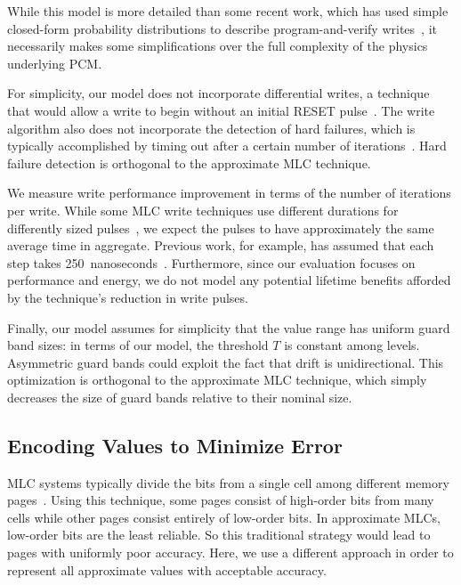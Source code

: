 \documentclass[prodmode,acmtocs]{acmsmall}
\begin{document}
While this model is more detailed than some recent work, which has used simple
closed-form probability distributions to describe program-and-verify
writes~\cite{improvingwrites,writecancel}, it necessarily makes some
simplifications over the full complexity of the physics underlying PCM.

For simplicity, our model does not incorporate differential writes, a
technique that would allow a write to begin without an initial
RESET pulse~\cite{improvingwrites}. The write algorithm also does not
incorporate the detection of hard failures, which is typically
accomplished by timing out after a certain number of
iterations~\cite{mlcflash}. Hard failure detection is orthogonal to
the approximate MLC technique.

We measure write performance improvement in terms of the number of
iterations per write. While some MLC write techniques use different
durations for differently sized pulses~\cite{mlcmodelchar,partialreset,mlcwritestrategies}, we expect the
pulses to have approximately the same average time in aggregate.
Previous work, for example, has assumed that each step takes
250~nanoseconds~\cite{writecancel,improvingwrites}.
Furthermore, since our evaluation focuses on performance and energy, we do not
model any potential lifetime benefits afforded by the technique's reduction in
write pulses.

Finally, our model assumes for simplicity that the value range has
uniform guard band sizes: in terms of our model, the threshold $T$ is
constant among levels.
Asymmetric
guard bands could exploit the fact that drift is unidirectional.
This optimization is orthogonal to the approximate MLC technique,
which simply decreases the size of guard bands relative to their
nominal size.

\subsection{Encoding Values to Minimize Error}
\label{sec:coding}

MLC systems typically divide the bits from a single cell among different
memory pages~\cite{mlcflash}.
Using this technique, some pages consist of high-order bits from many cells
while other pages consist entirely of low-order bits. In approximate MLCs,
low-order bits are the least reliable. So this traditional strategy would lead
to pages with uniformly poor accuracy.
Here, we use a different approach in
order to represent all approximate values with acceptable accuracy.
\end{document}
